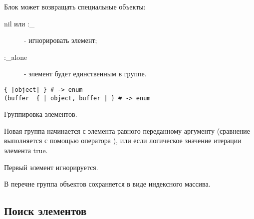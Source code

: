 \begin{methodlist}
  Блок может возвращать специальные объекты:
  \begin{description}
    \item[nil или :_] - игнорировать элемент;
    \item[:_alone] - элемент будет единственным в группе.
  \end{description}   
 
  \verb!{ |object| } # -> enum!
  \\\verb!(buffer  { | object, buffer | } # -> enum!

  Группировка элементов. 

  Новая группа начинается с элемента равного переданному аргументу (сравнение выполняется с помощью оператора \method{===}), или если логическое значение итерации элемента true. 

  Первый элемент игнорируется. 

  В перечне группа объектов сохраняется в виде индексного массива. 
\end{methodlist}

\subsection*{Поиск элементов}

